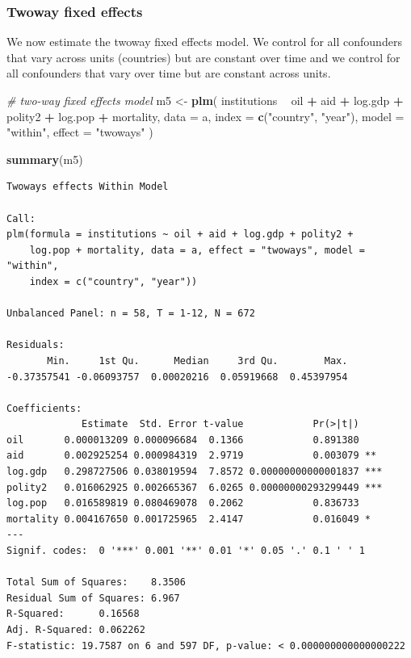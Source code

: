 \documentclass[]{article}
\newenvironment{Shaded}{\begin{snugshade}}{\end{snugshade}}
\newcommand{\KeywordTok}[1]{\textcolor[rgb]{0.13,0.29,0.53}{\textbf{#1}}}
\newcommand{\DataTypeTok}[1]{\textcolor[rgb]{0.13,0.29,0.53}{#1}}
\newcommand{\StringTok}[1]{\textcolor[rgb]{0.31,0.60,0.02}{#1}}
\newcommand{\CommentTok}[1]{\textcolor[rgb]{0.56,0.35,0.01}{\textit{#1}}}
\newcommand{\OperatorTok}[1]{\textcolor[rgb]{0.81,0.36,0.00}{\textbf{#1}}}
\newcommand{\NormalTok}[1]{#1}
\theoremstyle{definition}
\theoremstyle{definition}
\theoremstyle{definition}
\theoremstyle{remark}
\begin{document}
\subsubsection{Twoway fixed effects}\label{twoway-fixed-effects}

We now estimate the twoway fixed effects model. We control for all
confounders that vary across units (countries) but are constant over
time and we control for all confounders that vary over time but are
constant across units.

\begin{Shaded}
\begin{Highlighting}[]
\CommentTok{# two-way fixed effects model}
\NormalTok{m5 <-}\StringTok{  }\KeywordTok{plm}\NormalTok{(}
\NormalTok{  institutions }\OperatorTok{~}\StringTok{ }\NormalTok{oil }\OperatorTok{+}\StringTok{ }\NormalTok{aid }\OperatorTok{+}\StringTok{ }\NormalTok{log.gdp }\OperatorTok{+}\StringTok{ }\NormalTok{polity2 }\OperatorTok{+}\StringTok{ }\NormalTok{log.pop }\OperatorTok{+}\StringTok{ }\NormalTok{mortality,}
  \DataTypeTok{data =}\NormalTok{ a,}
  \DataTypeTok{index =} \KeywordTok{c}\NormalTok{(}\StringTok{"country"}\NormalTok{, }\StringTok{"year"}\NormalTok{),}
  \DataTypeTok{model =} \StringTok{"within"}\NormalTok{,}
  \DataTypeTok{effect =} \StringTok{"twoways"}
\NormalTok{  )}

\KeywordTok{summary}\NormalTok{(m5)}
\end{Highlighting}
\end{Shaded}

\begin{verbatim}
Twoways effects Within Model

Call:
plm(formula = institutions ~ oil + aid + log.gdp + polity2 + 
    log.pop + mortality, data = a, effect = "twoways", model = "within", 
    index = c("country", "year"))

Unbalanced Panel: n = 58, T = 1-12, N = 672

Residuals:
       Min.     1st Qu.      Median     3rd Qu.        Max. 
-0.37357541 -0.06093757  0.00020216  0.05919668  0.45397954 

Coefficients:
             Estimate  Std. Error t-value            Pr(>|t|)    
oil       0.000013209 0.000096684  0.1366            0.891380    
aid       0.002925254 0.000984319  2.9719            0.003079 ** 
log.gdp   0.298727506 0.038019594  7.8572 0.00000000000001837 ***
polity2   0.016062925 0.002665367  6.0265 0.00000000293299449 ***
log.pop   0.016589819 0.080469078  0.2062            0.836733    
mortality 0.004167650 0.001725965  2.4147            0.016049 *  
---
Signif. codes:  0 '***' 0.001 '**' 0.01 '*' 0.05 '.' 0.1 ' ' 1

Total Sum of Squares:    8.3506
Residual Sum of Squares: 6.967
R-Squared:      0.16568
Adj. R-Squared: 0.062262
F-statistic: 19.7587 on 6 and 597 DF, p-value: < 0.000000000000000222
\end{verbatim}
\end{document}
